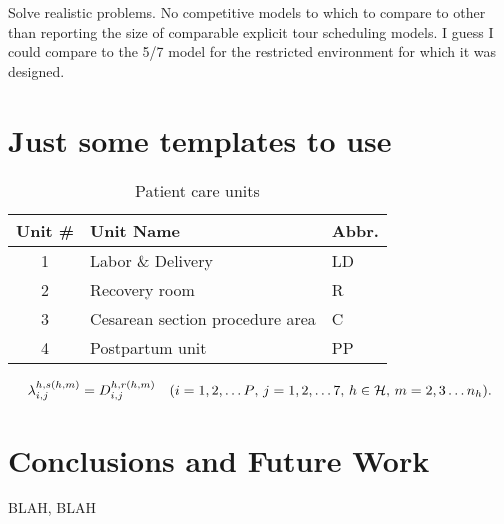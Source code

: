 \documentclass{article}
\begin{document}
Solve realistic problems. No competitive models to which to compare to other than reporting the size of comparable explicit tour scheduling models. I guess I could compare to the 5/7 model for the restricted environment for which it was designed.

\section{Just some templates to use}


\begin{table}
  \centering
  \caption{Patient care units}\label{table:units}
\begin{tabular}{cll}\hline
 Unit \#       & Unit Name    & Abbr.   \\ \hline
  1       & Labor \& Delivery    & LD    \\
  2       & Recovery room   & R    \\
  3       & Cesarean section procedure area    & C    \\
  4       & Postpartum unit    & PP   \\ \hline  
\end{tabular}
\end{table}



\begin{equation}
\label{eqn:flowcons}
\lambda_{i,j}^{h,s(h,m)}=D_{i,j}^{h,r(h,m)} \quad \text{($i=1,2,\ldots P$, $j=1,2,\ldots 7$, $h \in {\cal H}$, $m=2,3\ldots n_{h}$).}
\end{equation}
\section{Conclusions and Future Work}
\label{sec-conclusions}


BLAH, BLAH








%
\end{document}
